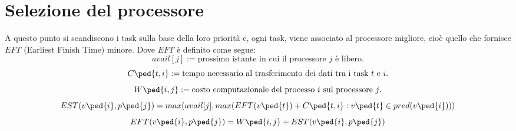 \section{Selezione del processore}
A questo punto si scandiscono i task sulla base della loro priorità e, ogni task, viene associato al processore migliore, cioè quello che fornisce $EFT$ (Earliest Finish Time) minore. 
Dove $EFT$ è definito come segue:
\begin{displaymath}
	avail[j] := \text{prossimo istante in cui il processore $j$ è libero.}
\end{displaymath}
\begin{displaymath}
	C\ped{t,i} := \text{tempo necessario al trasferimento dei dati tra i task $t$ e $i$.} 
\end{displaymath}
\begin{displaymath}
	W\ped{i,j} := \text{costo computazionale del processo $i$ sul processore $j$.} 
\end{displaymath}
\begin{equation}\label{EST}
	EST(v\ped{i},p\ped{j}) = max(avail[j], max(EFT(v\ped{t}) + C\ped{t,i} : v\ped{t} \in pred(v\ped{i})))
\end{equation}
\begin{equation}\label{EFT}
	EFT(v\ped{i},p\ped{j}) = W\ped{i,j} + EST(v\ped{i},p\ped{j})
\end{equation}